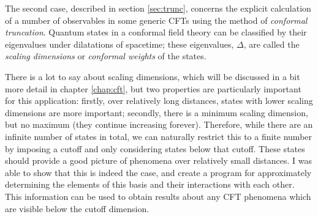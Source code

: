 The second case, described in section \ref{sec:trunc}, concerns the explicit 
calculation of a number of observables in some generic CFTs using the method of
\emph{conformal truncation}. Quantum states in a conformal field theory can be
classified by their eigenvalues under dilatations of spacetime; these 
eigenvalues, $\Delta$, are called the \emph{scaling dimensions} or 
\emph{conformal weights} of the states.

There is a lot to say about scaling dimensions, which will be discussed in a bit
more detail in chapter \ref{chap:cft}, but two properties are particularly 
important for this application: firstly, over relatively long distances, states 
with lower scaling dimensions are more important; secondly, there is a minimum 
scaling dimension, but no maximum (they continue increasing forever). Therefore, 
while there are an infinite number of states in total, we can naturally restrict 
this to a finite number by imposing a cutoff and only considering states below 
that cutoff. These states should provide a good picture of phenomena over 
relatively small distances. I was able to show that this is indeed the case, and 
create a program for approximately determining the elements of this basis and 
their interactions with each other. This information can be used to obtain
results about any CFT phenomena which are visible below the cutoff dimension.

